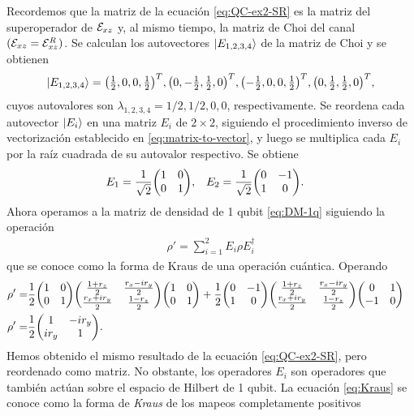Recordemos que la matriz de la ecuación \eqref{eq:QC-ex2-SR}
es la matriz del superoperador de $\mathcal{E}_{xz}$ y, al mismo tiempo,
la matriz de Choi del canal $(\mathcal{E}_{xz}=\mathcal{E}_{xz}^R)$.  
Se calculan los autovectores $\ket{E_{1,2,3,4}}$ de 
la matriz de Choi y se obtienen
\begin{align}
\ket{E_{1,2,3,4}}=
\mqty(\frac{1}{2},0,0,\frac{1}{2})^T,
\mqty(0,-\frac{1}{2},\frac{1}{2},0)^T,
\mqty(-\frac{1}{2},0,0,\frac{1}{2})^T,
\mqty(0,\frac{1}{2},\frac{1}{2},0)^T,
\end{align}
cuyos autovalores son $\lambda_{1,2,3,4}=1/2,1/2,0,0$, respectivamente.
Se reordena cada autovector $\ket{E_i}$ en una matriz
$E_i$ de $2\times2$, siguiendo el procedimiento 
inverso de vectorización establecido en
\eqref{eq:matrix-to-vector}, y luego se multiplica cada $E_i$ por 
la raíz cuadrada de su autovalor respectivo. Se obtiene
\begin{align}
E_1&=
\frac{1}{\sqrt{2}}
\mqty(
1 & 0\\
0 & 1
),
&
E_2&=
\frac{1}{\sqrt{2}}
\mqty(
0 & -1\\
1 & 0
).
\end{align}
Ahora operamos a la matriz de densidad de 1 qubit 
\eqref{eq:DM-1q} siguiendo la operación
\begin{align}
\rho'=\sum_{i=1}^2E_i\rho E_i^{\dagger}
\label{eq:Kraus}
\end{align}
que se conoce como la forma de Kraus de una operación cuántica. Operando
\begin{align}
\rho'=&
\frac{1}{2}
\mqty(
1 & 0\\
0 & 1
)
\mqty(
\frac{1+r_z}{2}& \frac{r_x-ir_y}{2}\\
\frac{r_x+ir_y}{2} & \frac{1-r_z}{2}
)
\mqty(
1 & 0\\
0 & 1
)
+
\frac{1}{2}
\mqty(
0 & -1\\
1 & 0
)
\mqty(
\frac{1+r_z}{2}& \frac{r_x-ir_y}{2}\\
\frac{r_x+ir_y}{2} & \frac{1-r_z}{2}
)
\mqty(
0 & 1\\
-1 & 0
)&
\nonumber\\
\rho'=&
\frac{1}{2}
\mqty(
1 & -ir_y\\
ir_y & 1
).
\label{eq:QC-ex2-KR}
\end{align}
Hemos obtenido el mismo resultado de la ecuación 
\eqref{eq:QC-ex2-SR}, pero reordenado como matriz. 
No obstante, los operadores $E_i$ son
operadores que también actúan sobre el espacio de Hilbert de 1 qubit. 
La ecuación \eqref{eq:Kraus} se conoce 
como la forma de \textit{Kraus} de los mapeos completamente positivos
